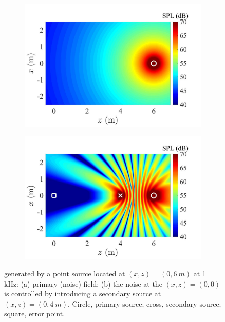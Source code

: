 \begin{figure}[!htb]
    \centering
    \begin{subfigure}{0.49\textwidth}
        \centering
        \includegraphics[width = 1\textwidth]{fig/cal_ANC_demo_Off_1kHz_resize.jpg}
        \caption{}
    \end{subfigure}
    \begin{subfigure}{0.49\textwidth}
        \centering
        \includegraphics[width = 1\textwidth]{fig/cal_ANC_demo_On_1kHz_SecPointMonopole_dse4m_resize.jpg}
        \caption{}
    \end{subfigure}
    \caption{ generated by a point source located at $(x,z) = (0,\SI{6}{m})$ at 1 kHz: (a) primary (noise) field; (b) the noise at the $(x,z) = (0,0)$ is controlled by introducing a secondary source at $(x,z) = (0, \SI{4}{m})$. 
        Circle, primary source; cross, secondary source; square, error point. 
    }
    \label{fig:intro:389fsdp}
\end{figure}


